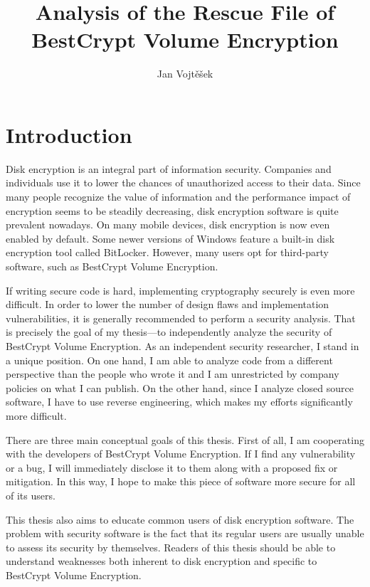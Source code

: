 \documentclass[thesis=B,english]{FITthesis}[2012/10/20]
\title{Analysis of the Rescue File of BestCrypt Volume Encryption}
\author{Jan Vojt{\v e}{\v s}ek} %
\begin{document}
	
	
	\chapter{Introduction}
	
	Disk encryption is an integral part of information security. Companies and individuals use it to lower the chances of unauthorized access to their data. Since many people recognize the value of information and the performance impact of encryption seems to be steadily decreasing, disk encryption software is quite prevalent nowadays. On many mobile devices, disk encryption is now even enabled by default. Some newer versions of Windows feature a built-in disk encryption tool called BitLocker. However, many users opt for third-party software, such as BestCrypt Volume Encryption.
	
	If writing secure code is hard, implementing cryptography securely is even more difficult. In order to lower the number of design flaws and implementation vulnerabilities, it is generally recommended to perform a security analysis. That is precisely the goal of my thesis---to independently analyze the security of BestCrypt Volume Encryption. As an independent security researcher, I stand in a unique position. On one hand, I am able to analyze code from a different perspective than the people who wrote it and I am unrestricted by company policies on what I can publish. On the other hand, since I analyze closed source software, I have to use reverse engineering, which makes my efforts significantly more difficult.
	
	There are three main conceptual goals of this thesis. First of all, I am cooperating with the developers of BestCrypt Volume Encryption. If I find any vulnerability or a bug, I will immediately disclose it to them along with a proposed fix or mitigation. In this way, I hope to make this piece of software more secure for all of its users.
	
	This thesis also aims to educate common users of disk encryption software. The problem with security software is the fact that its regular users are usually unable to assess its security by themselves. Readers of this thesis should be able to understand weaknesses both inherent to disk encryption and specific to BestCrypt Volume Encryption.
	
\end{document}
